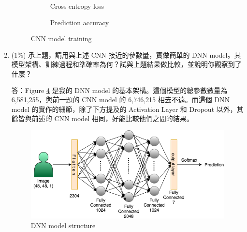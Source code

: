 \documentclass[12pt,a4paper]{extarticle}
\begin{document}
\begin{enumerate}
  \begin{figure}[ht]
    \begin{subfigure}[t]{0.5\textwidth}
    \caption{Cross-entropy loss}
    \label{fig:cnn-epoch-loss}
    \end{subfigure}
    \begin{subfigure}[t]{0.5\textwidth}
      \caption{Prediction accuracy}
      \label{fig:cnn-epoch-acc}
    \end{subfigure}
    \caption{CNN model training}
    \label{fig:cnn-training}
  \end{figure}

  \newpage

	\item (1\%) 承上題，請用與上述 CNN 接近的參數量，實做簡單的 DNN model。其模型架構、訓練過程和準確率為何？試與上題結果做比較，並說明你觀察到了什麼？
  \par 答：Figure \ref{fig:dnn-model-structure} 是我的 DNN model 的基本架構。這個模型的總參數數量為 6,581,255，與前一題的 CNN model 的 6,746,215 相去不遠。而這個 DNN model 的實作的細節，除了下方提及的 Activation Layer 和 Dropout 以外，其餘皆與前述的 CNN model 相同，好能比較他們之間的結果。

  \begin{figure}[ht]
    \centering
    \includegraphics[width=0.9\linewidth]{images/dnn_model_structure.png}
    \caption{DNN model structure}
    \label{fig:dnn-model-structure}
  \end{figure}


\end{enumerate}
\end{document}
